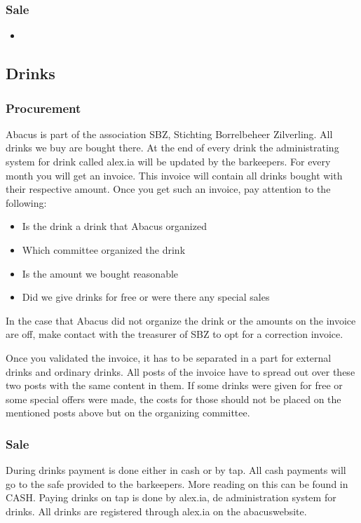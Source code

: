 \documentclass{report}
\begin{document}
\subsubsection{Sale}
\begin{itemize}
\vspace{-1mm}
\itemsep-1mm 
\item
\end{itemize}

\subsection{Drinks}
\subsubsection{Procurement}
Abacus is part of the association SBZ, Stichting Borrelbeheer Zilverling. All drinks we buy are bought there. At the end of every drink the administrating system for drink called alex.ia will be updated by the barkeepers. For every month you will get an invoice. This invoice will contain all drinks bought with their respective amount. Once you get such an invoice, pay attention to the following:  
\begin{itemize} 
\vspace{-1mm}
\itemsep-1mm 
\item Is the drink a drink that Abacus organized
\item Which committee organized the drink
\item Is the amount we bought reasonable
\item Did we give drinks for free or were there any special sales
\end{itemize}
In the case that Abacus did not organize the drink or the amounts on the invoice are off, make contact with the treasurer of SBZ to opt for a correction invoice.

Once you validated the invoice, it has to be separated in a part for external drinks and ordinary drinks. All posts of the invoice have to spread out over these two posts with the same content in them. If some drinks were given for free or some special offers were made, the costs for those should not be placed on the mentioned posts above but on the organizing committee.  

\subsubsection{Sale}
During drinks payment is done either in cash or by tap. All cash payments will go to the safe provided to the barkeepers. More reading on this can be found in CASH. Paying drinks on tap is done by alex.ia, de administration system for drinks. All drinks are registered through alex.ia on the abacuswebsite.  
\end{document}
